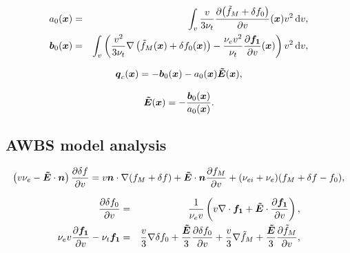 \documentclass[preprint,12pt]{elsarticle}
\newcounter{bla}
\begin{document}
\begin{eqnarray}
  a_0(\boldsymbol{x}) &=& \int_{v}\frac{v}{3 \nu_{t}} \frac{\partial{\left(\tilde{f}_M+ \delta f_0\right)}}{\partial{v}}(\boldsymbol{x})
  v^2\, \text{d}v , \nonumber \\
  \boldsymbol{b}_{0}(\boldsymbol{x}) &=& \int_{v}\left(  
  \frac{v^2}{3 \nu_{t}}\nabla\left(\tilde{f}_M(\boldsymbol{x}) + \delta f_0(\boldsymbol{x})\right)
  - \frac{\nu_{e}v^2}{\nu_{t}}\frac{\partial{\boldsymbol{f_1}}}{\partial{v}}(\boldsymbol{x})
  \right)v^2\, \text{d}v , \nonumber 
\end{eqnarray}

\begin{equation}
  \boldsymbol{q}_c(\boldsymbol{x}) 
  = -\boldsymbol{b}_{0}(\boldsymbol{x}) 
  - a_{0}(\boldsymbol{x})\boldsymbol{\tilde{E}}(\boldsymbol{x}) ,
  \nonumber \label{eq:OOE_HOFcurrent}
\end{equation}


\begin{equation}
  \boldsymbol{\tilde{E}}(\boldsymbol{x}) = -\frac{\boldsymbol{b}_{0}(\boldsymbol{x})}{a_{0}(\boldsymbol{x})} .
  \label{eq:OOE_E_j0}
\end{equation}

\subsection{AWBS model analysis}
\label{sec:OOE_AWBS_model_analysis}
\begin{multline}
  \left(v \nu_{e} - \boldsymbol{\tilde{E}}\cdot\boldsymbol{n}\right)\frac{\partial{\delta f}}{\partial{v}} 
  =
  v\boldsymbol{n}\cdot\nabla (f_M + \delta f) + \boldsymbol{\tilde{E}}\cdot\boldsymbol{n}\frac{\partial{f_M}}{\partial{v}} 
  + (\nu_{ei} + \nu_{e}) (f_M + \delta f - f_0) ,
  \label{eq:OOE_AWBS_model_analysis}
\end{multline}

\begin{eqnarray}
  \frac{\partial{\delta f_0}}{\partial{v}} &=&
  \frac{1}{\nu_{e}v}\left(v\nabla\cdot\boldsymbol{f_1} + \boldsymbol{\tilde{E}}\cdot
  \frac{\partial{\boldsymbol{f_1}}}{\partial{v}}\right) , 
  \nonumber\\
  \nu_{e}v\frac{\partial{\boldsymbol{f_1}}}{\partial{v}} - \nu_{t}\boldsymbol{f_1} &=& 
  \frac{v}{3}\nabla\delta f_0 + 
  \frac{\boldsymbol{\tilde{E}}}{3}\frac{\partial{\delta f_0}}{\partial{v}}
  + \frac{v}{3}\nabla\tilde{f}_M + \frac{\boldsymbol{\tilde{E}}}{3}\frac{\partial{\tilde{f}_M}}{\partial{v}} ,
  \nonumber
\end{eqnarray}
\end{document}
